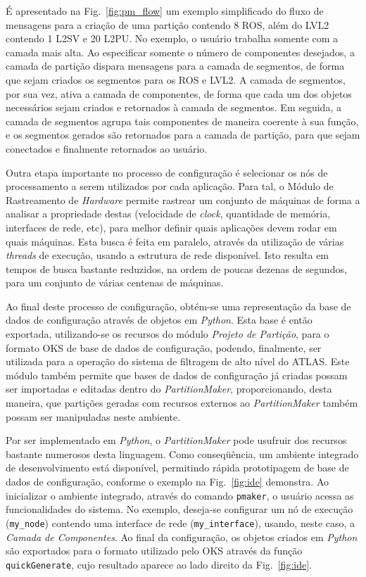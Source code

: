 É apresentado na Fig.~\ref{fig:pm_flow} um exemplo simplificado do fluxo de mensagens para a criação de uma partição contendo 8 ROS, além do LVL2 contendo 1 L2SV e 20 L2PU. No exemplo, o usuário trabalha somente com a camada mais alta. Ao especificar somente o número de componentes desejados, a camada de partição dispara mensagens para a camada de segmentos, de forma que sejam criados os segmentos para os ROS e LVL2. A camada de segmentos, por sua vez, ativa a camada de componentes, de forma que cada um dos objetos necessários sejam criados e retornados à camada de segmentos. Em seguida, a camada de segmentos agrupa tais componentes de maneira coerente à sua função, e os segmentos gerados são retornados para a camada de partição, para que sejam conectados e finalmente retornados ao usuário.

Outra etapa importante no processo de configuração é selecionar os nós de processamento a serem utilizados por cada aplicação. Para tal, o Módulo de Rastreamento de \emph{Hardware} permite rastrear um conjunto de máquinas de forma a analisar a propriedade destas (velocidade de \emph{clock}, quantidade de memória, interfaces de rede, etc), para melhor definir quais aplicações devem rodar em quais máquinas. Esta busca é feita em paralelo, através da utilização de várias \emph{threads} \cite{bib:modern_operating_systems} de execução, usando a estrutura de rede disponível. Isto resulta em tempos de busca bastante reduzidos, na ordem de poucas dezenas de segundos, para um conjunto de várias centenas de máquinas. 

Ao final deste processo de configuração, obtém-se uma representação da base de dados de configuração através de objetos em \emph{Python}. Esta base é então exportada, utilizando-se os recursos do módulo \emph{Projeto de Partição}, para o formato OKS de base de dados de configuração, podendo, finalmente, ser utilizada para a operação do sistema de filtragem de alto nível do ATLAS. Este módulo também permite que bases de dados de configuração já criadas possam ser importadas e editadas dentro do \emph{PartitionMaker}, proporcionando, desta maneira, que partições geradas com recursos externos ao \emph{PartitionMaker} também possam ser manipuladas neste ambiente.

Por ser implementado em \emph{Python}, o \emph{PartitionMaker} pode usufruir dos recursos bastante numerosos  desta linguagem. Como conseqüência, um ambiente integrado de desenvolvimento está disponível, permitindo rápida prototipagem de base de dados de configuração, conforme o exemplo na Fig.~\ref{fig:ide} demonstra. Ao inicializar o ambiente integrado, através do comando \texttt{pmaker}, o usuário acessa as funcionalidades do sistema. No exemplo, deseja-se configurar um nó de execução (\texttt{my\_node}) contendo uma interface de rede (\texttt{my\_interface}), usando, neste caso, a \emph{Camada de Componentes}. Ao final da configuração, os objetos criados em \emph{Python} são exportados para o formato utilizado pelo OKS através da função \texttt{quickGenerate}, cujo resultado aparece ao lado direito da Fig.~\ref{fig:ide}.

